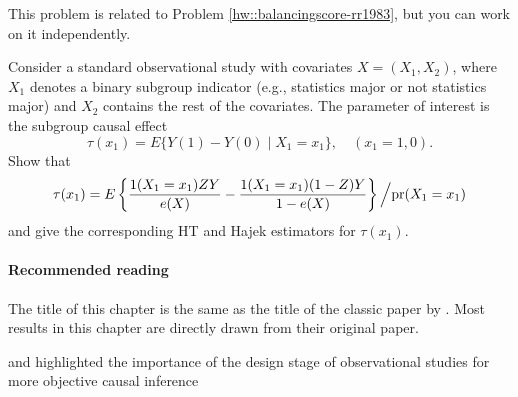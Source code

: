 This problem is related to Problem \ref{hw::balancingscore-rr1983}, but you can work on it independently. 

Consider a standard observational study with covariates $X = (X_1, X_2)$, where $X_1$ denotes a binary subgroup indicator (e.g., statistics major or not statistics major) and $X_2$ contains the rest of the covariates. The parameter of interest is the subgroup causal effect 
$$
\tau(x_1) = E\{ Y(1) - Y(0) \mid X_1 = x_1  \},\quad (x_1=1,0).
$$
Show that
$$
\tau(x_1) =  E\left\{   \frac{  1(X_1 = x_1) ZY}{ e(X) }   - \frac{  1(X_1 = x_1) (1-Z)Y}{ 1 -  e(X) }    \right\} \Big /  \textup{pr}(X_1 = x_1)
$$
and give the corresponding HT and Hajek estimators for $\tau(x_1) $. 



 \paragraph{Recommended reading}
 
 
The title of this chapter is the same as the title of the classic paper by \citet{rosenbaum1983central}. Most results in this chapter are directly drawn from their original paper.  


\citet{rubin2007design} and \citet{rubin2008objective} highlighted the importance of the design stage of observational studies for more objective causal inference 
 
